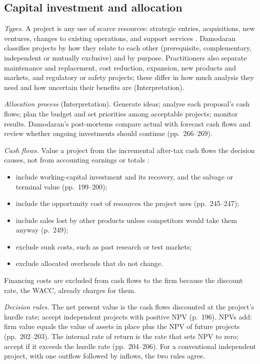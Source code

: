 \subsection{Capital investment and allocation}

\begin{qfmethod}\label{meth:capital-project-evaluation}
 \emph{Types.} A project is any use of scarce resources: strategic entries, acquisitions, new ventures, changes to existing operations, and support services \citep[pp.~160--162]{applied-corporate-finance-2014}. Damodaran classifies projects by how they relate to each other (prerequisite, complementary, independent or mutually exclusive) and by purpose. Practitioners also separate maintenance and replacement, cost reduction, expansion, new products and markets, and regulatory or safety projects; these differ in how much analysis they need and how uncertain their benefits are (Interpretation).

\emph{Allocation process} (Interpretation). Generate ideas; analyse each proposal's cash flows; plan the budget and set priorities among acceptable projects; monitor results. Damodaran's post-mortems compare actual with forecast cash flows and review whether ongoing investments should continue (pp.~266--269).

\emph{Cash flows.} Value a project from the incremental after-tax cash flows the decision causes, not from accounting earnings or totals \citep[pp.~171--173]{applied-corporate-finance-2014}:
\begin{itemize}
\item include working-capital investment and its recovery, and the salvage or terminal value (pp.~199--200);
\item include the opportunity cost of resources the project uses (pp.~245--247);
\item include sales lost by other products unless competitors would take them anyway (p.~249);
\item exclude sunk costs, such as past research or test markets;
\item exclude allocated overheads that do not change.
\end{itemize}
Financing costs are excluded from cash flows to the firm because the discount rate, the WACC, already charges for them.

\emph{Decision rules.} The net present value is the cash flows discounted at the project's hurdle rate; accept independent projects with positive NPV (p.~196). NPVs add: firm value equals the value of assets in place plus the NPV of future projects (pp.~202--203). The internal rate of return is the rate that sets NPV to zero; accept if it exceeds the hurdle rate (pp.~204--206). For a conventional independent project, with one outflow followed by inflows, the two rules agree.


\end{qfmethod}
